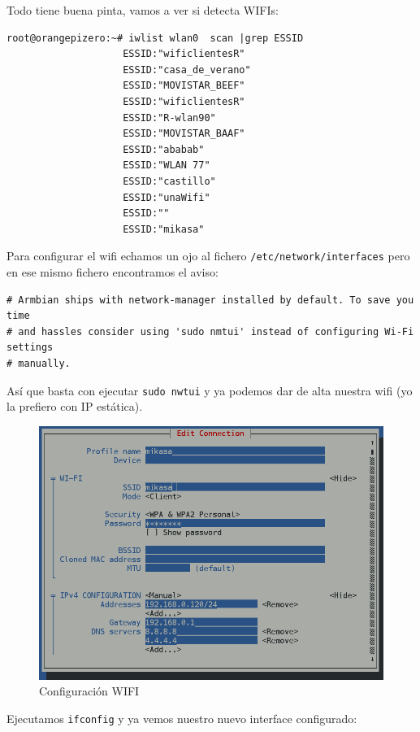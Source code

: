 \documentclass[12pt,spanish,]{scrartcl}
\begin{document}
Todo tiene buena pinta, vamos a ver si detecta WIFIs:

\begin{verbatim}
root@orangepizero:~# iwlist wlan0  scan |grep ESSID
                    ESSID:"wificlientesR"
                    ESSID:"casa_de_verano"
                    ESSID:"MOVISTAR_BEEF"
                    ESSID:"wificlientesR"
                    ESSID:"R-wlan90"
                    ESSID:"MOVISTAR_BAAF"
                    ESSID:"ababab"
                    ESSID:"WLAN 77"
                    ESSID:"castillo"
                    ESSID:"unaWifi"
                    ESSID:""
                    ESSID:"mikasa"
\end{verbatim}

Para configurar el wifi echamos un ojo al fichero
\texttt{/etc/network/interfaces} pero en ese mismo fichero encontramos
el aviso:

\begin{verbatim}
# Armbian ships with network-manager installed by default. To save you time
# and hassles consider using 'sudo nmtui' instead of configuring Wi-Fi settings
# manually.
\end{verbatim}

Así que basta con ejecutar \texttt{sudo\ nwtui} y ya podemos dar de alta
nuestra wifi (yo la prefiero con IP estática).

\begin{figure}
\centering
\includegraphics{src/img/OrangePiZero_tmtui.png}
\caption{Configuración WIFI}
\end{figure}

Ejecutamos \texttt{ifconfig} y ya vemos nuestro nuevo interface
configurado:
\end{document}
